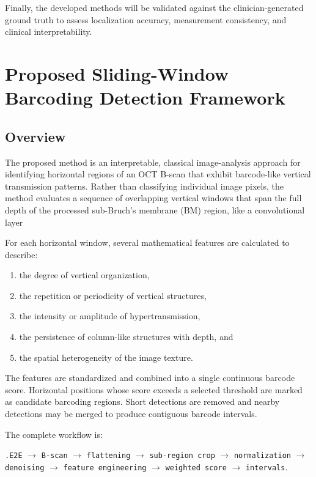 \documentclass[11pt]{article}
\begin{document}
Finally, the developed methods will be validated against the clinician-generated ground truth to assess localization accuracy, measurement consistency, and clinical interpretability.

\section{Proposed Sliding-Window Barcoding Detection Framework}

\subsection{Overview}
The proposed method is an interpretable, classical image-analysis approach for
identifying horizontal regions of an OCT B-scan that exhibit barcode-like
vertical transmission patterns. Rather than classifying individual image pixels,
the method evaluates a sequence of overlapping vertical windows that span the
full depth of the processed sub-Bruch's membrane (BM) region, like a convolutional layer

For each horizontal window, several mathematical features are calculated to
describe:

\begin{enumerate}
    \item the degree of vertical organization,
    \item the repetition or periodicity of vertical structures,
    \item the intensity or amplitude of hypertransmission,
    \item the persistence of column-like structures with depth, and
    \item the spatial heterogeneity of the image texture.
\end{enumerate}

The features are standardized and combined into a single continuous barcode
score. Horizontal positions whose score exceeds a selected threshold are marked
as candidate barcoding regions. Short detections are removed and nearby
detections may be merged to produce contiguous barcode intervals.

The complete workflow is:

\begin{center}
\texttt{.E2E}
$\rightarrow$
\texttt{B-scan}
$\rightarrow$
\texttt{flattening}
$\rightarrow$
\texttt{sub-region crop}
$\rightarrow$
\texttt{normalization}
$\rightarrow$
\texttt{denoising}
$\rightarrow$
\texttt{feature engineering}
$\rightarrow$
\texttt{weighted score}
$\rightarrow$
\texttt{intervals}.
\end{center}
\end{document}
